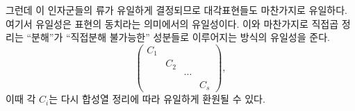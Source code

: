 \documentclass[11pt]{article}
\begin{document}
그런데 이 인자군들의 류가 유일하게 결정되므로 대각표현들도 마찬가지로 유일하다. 여기서 유일성은 표현의 동치라는 의미에서의 유일성이다. 이와 마찬가지로 직접곱 정리는 ``분해''가 ``직접분해 불가능한'' 성분들로 이루어지는 방식의 유일성을 준다.
\[
\begin{pmatrix}
C_1&&&\\
&C_2&&\\
&&\cdots&\\
&&&C_s
\end{pmatrix},
\]
이때 각 $C_i$는 다시 합성열 정리에 따라 유일하게 환원될 수 있다.
\end{document}
